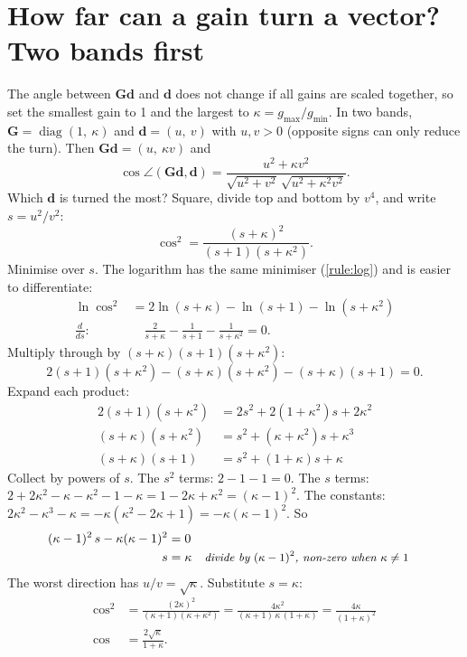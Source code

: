 \documentclass[11pt,a4paper,oneside,openany]{book}
\newcommand{\B}[1]{{\symbf{#1}}}
\newcommand{\B}[1]{{\bm{#1}}}
\newcommand{\vd}{\B{d}}
\newcommand{\mG}{\B{G}}
\newcommand{\why}[1]{&&\text{\small\itshape #1}}
\begin{document}
\section{How far can a gain turn a vector? Two bands first}

The angle between $\mG\vd$ and $\vd$ does not change if all gains are scaled together, so set the smallest gain to 1 and the largest to $\kappa=g_{\max}/g_{\min}$.
In two bands, $\mG=\operatorname{diag}(1,\ \kappa)$ and $\vd=(u,\ v)$ with $u,v>0$ (opposite signs can only reduce the turn). Then $\mG\vd=(u,\ \kappa v)$ and
\[
  \cos\angle(\mG\vd,\vd)=\frac{u^2+\kappa v^2}{\sqrt{u^2+v^2}\,\sqrt{u^2+\kappa^2v^2}} .
\]
Which $\vd$ is turned the most? Square, divide top and bottom by $v^4$, and write $s=u^2/v^2$:
\[
  \cos^2=\frac{(s+\kappa)^2}{(s+1)(s+\kappa^2)} .
\]
Minimise over $s$. The logarithm has the same minimiser (\cref{rule:log}) and is easier to differentiate:
\begin{align*}
\ln\cos^2 &= 2\ln(s+\kappa)-\ln(s+1)-\ln(s+\kappa^2)\\
\frac{d}{ds}: &\quad \frac{2}{s+\kappa}-\frac{1}{s+1}-\frac{1}{s+\kappa^2}=0 .
\end{align*}
Multiply through by $(s+\kappa)(s+1)(s+\kappa^2)$:
\[
  2(s+1)(s+\kappa^2)-(s+\kappa)(s+\kappa^2)-(s+\kappa)(s+1)=0 .
\]
Expand each product:
\begin{align*}
2(s+1)(s+\kappa^2) &= 2s^2+2(1+\kappa^2)s+2\kappa^2\\
(s+\kappa)(s+\kappa^2) &= s^2+(\kappa+\kappa^2)s+\kappa^3\\
(s+\kappa)(s+1) &= s^2+(1+\kappa)s+\kappa
\end{align*}
Collect by powers of $s$. The $s^2$ terms: $2-1-1=0$. The $s$ terms: $2+2\kappa^2-\kappa-\kappa^2-1-\kappa=1-2\kappa+\kappa^2=(\kappa-1)^2$. The constants:
$2\kappa^2-\kappa^3-\kappa=-\kappa(\kappa^2-2\kappa+1)=-\kappa(\kappa-1)^2$. So
\begin{align*}
(\kappa-1)^2\,s-\kappa(\kappa-1)^2 &= 0\\
s &= \kappa \why{divide by $(\kappa-1)^2$, non-zero when $\kappa\ne1$}
\end{align*}
The worst direction has $u/v=\sqrt\kappa$. Substitute $s=\kappa$:
\begin{align*}
\cos^2 &= \frac{(2\kappa)^2}{(\kappa+1)(\kappa+\kappa^2)}=\frac{4\kappa^2}{(\kappa+1)\,\kappa\,(1+\kappa)}=\frac{4\kappa}{(1+\kappa)^2}\\
\cos &= \frac{2\sqrt\kappa}{1+\kappa} .
\end{align*}
\end{document}
